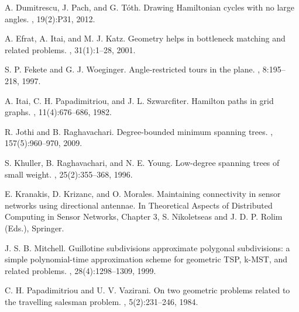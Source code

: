 \documentclass[11pt]{article}
\begin{document}
\begin{thebibliography}{1}
A. Dumitrescu, J. Pach, and G. T{\'o}th.
Drawing Hamiltonian cycles with no large angles.
, 19(2):P31, 2012.

A. Efrat, A. Itai, and M. J. Katz.
\newblock Geometry helps in bottleneck matching and related problems.
, 31(1):1--28, 2001.

S. P. Fekete and G. J. Woeginger.
\newblock Angle-restricted tours in the plane.
, 8:195--218, 1997.




A. Itai, C. H. Papadimitriou, and J. L. Szwarcfiter.
\newblock Hamilton paths in grid graphs.
, 11(4):676--686, 1982.

R. Jothi and B. Raghavachari.
\newblock Degree-bounded minimum spanning trees.
, 157(5):960--970, 2009.


S. Khuller, B. Raghavachari, and N. E. Young.
\newblock Low-degree spanning trees of small weight.
, 25(2):355--368, 1996.

E. Kranakis, D. Krizanc, and O. Morales.
\newblock Maintaining connectivity in sensor networks using directional antennae.
In Theoretical Aspects of Distributed Computing in Sensor Networks, Chapter 3, S. Nikoletseas and J. D. P. Rolim (Eds.), Springer.
   
J. S. B. Mitchell.
\newblock Guillotine subdivisions approximate polygonal subdivisions: a simple polynomial-time approximation scheme for geometric TSP, k-MST, and related problems.
, 28(4):1298--1309, 1999.

C. H. Papadimitriou and U. V. Vazirani.
\newblock On two geometric problems related to the travelling salesman problem.
, 5(2):231--246, 1984.

\end{thebibliography}
\end{document}
